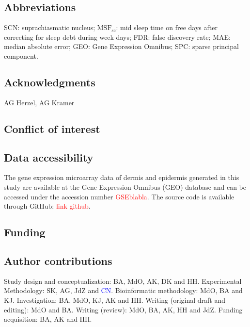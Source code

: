 \subsection*{Abbreviations}
SCN: suprachiasmatic nucleus; $\textrm{MSF}_\textrm{sc}$: mid sleep time on free days after correcting for sleep debt during week days; FDR: false discovery rate; MAE: median absolute error; GEO: Gene Expression Omnibus; SPC: sparse principal component.

\subsection*{Acknowledgments}
AG Herzel, AG Kramer 

\subsection*{Conflict of interest}


\subsection*{Data accessibility}
The gene expression microarray data of dermis and epidermis generated in this study are available at the Gene Expression Omnibus (GEO) database and can be accessed under the accession number \textcolor{red}{GSEblabla}. The source code is available through GitHub: \textcolor{red}{link github}. 

\subsection*{Funding}

\subsection*{Author contributions}
Study design and conceptualization: BA, MdO, AK, DK and HH. Experimental Methodology: SK, AG, JdZ and \textcolor{blue}{CN}. Bioinformatic methodology: MdO, BA and KJ. Investigation: BA, MdO, KJ, AK and HH. Writing (original draft and editing): MdO and BA. Writing (review): MdO, BA, AK, HH and JdZ. Funding acquisition: BA, AK and HH. 

